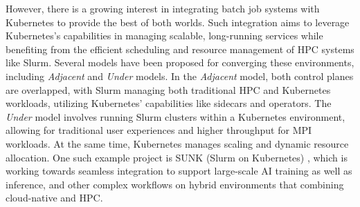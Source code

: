 However, there is a growing interest in integrating batch job systems with Kubernetes to provide the best of both worlds. Such integration aims to leverage Kubernetes's capabilities in managing scalable, long-running services while benefiting from the efficient scheduling and resource management of HPC systems like Slurm. Several models have been proposed for converging these environments, including \textit{Adjacent} and \textit{Under} models. In the \textit{Adjacent} model, both control planes are overlapped, with Slurm managing both traditional HPC and Kubernetes workloads, utilizing Kubernetes' capabilities like sidecars and operators. The \textit{Under} model involves running Slurm clusters within a Kubernetes environment, allowing for traditional user experiences and higher throughput for MPI workloads. At the same time, Kubernetes manages scaling and dynamic resource allocation. One such example project is SUNK (Slurm on Kubernetes) \cite{SlurmK8sIntegration}, which is working towards seamless integration to support large-scale AI training as well as inference, and other complex workflows on hybrid environments that combining cloud-native and HPC.